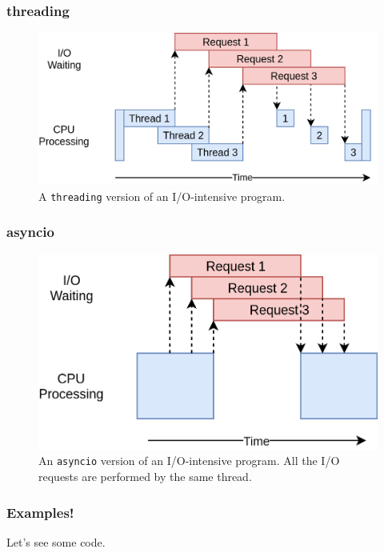 \documentclass{beamer}
\begin{document}
    \begin{frame}
        \frametitle{threading}

        \begin{figure}
            \includegraphics[width=\linewidth]{../figures/Threading.png}
            \caption{A \texttt{threading} version of an I/O-intensive program.}
        \end{figure}

    \end{frame}

    \begin{frame}
        \frametitle{asyncio}

        \begin{figure}
            \includegraphics[width=\linewidth]{../figures/Asyncio.png}
            \caption{An \texttt{asyncio} version of an I/O-intensive program. All the I/O requests are
            performed by the same thread.}
        \end{figure}

    \end{frame}



    \begin{frame}
        \frametitle{Examples!}
        \centering
        Let's see some code.

    \end{frame}
\end{document}
